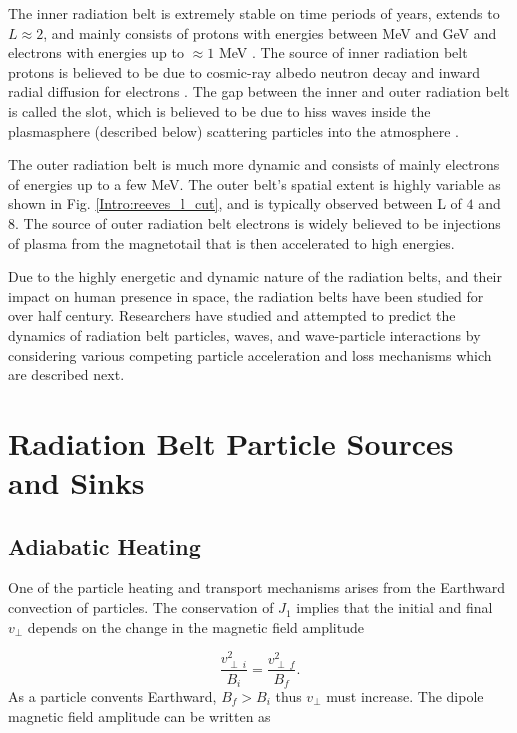The inner radiation belt is extremely stable on time periods of years, extends to $L \approx 2$, and mainly consists of protons with energies between MeV and GeV and electrons with energies up to $\approx 1$ MeV \citep{Claudepierre2019}. The source of inner radiation belt protons is believed to be due to cosmic-ray albedo neutron decay \citep[e.g.][]{Li2017_CRAND} and inward radial diffusion for electrons \citep[e.g.][]{O'Brien2016_inner}. The gap between the inner and outer radiation belt is called the slot, which is believed to be due to hiss waves inside the plasmasphere (described below) scattering particles into the atmosphere \citep[e.g.][]{Lyons1973, Breneman2015}.

The outer radiation belt is much more dynamic and consists of mainly electrons of energies up to a few MeV. The outer belt's spatial extent is highly variable as shown in Fig. \ref{Intro:reeves_l_cut}, and is typically observed between L of $4$ and $8$. The source of outer radiation belt electrons is widely believed to be injections of plasma from the magnetotail that is then accelerated to high energies.

Due to the highly energetic and dynamic nature of the radiation belts, and their impact on human presence in space, the radiation belts have been studied for over half century. Researchers have studied and attempted to predict the dynamics of radiation belt particles, waves, and wave-particle interactions by considering various competing particle acceleration and loss mechanisms which are described next.

\section{Radiation Belt Particle Sources and Sinks}\label{Intro:sources_sinks}

\subsection{Adiabatic Heating}\label{Intro:adiabatic_heating}
One of the particle heating and transport mechanisms arises from the Earthward convection of particles. The conservation of $J_1$ implies that the initial and final $v_\perp$ depends on the change in the magnetic field amplitude

\begin{equation}
\frac{v^2_{\perp \ i}}{B_i} = \frac{v^2_{\perp \ f}}{B_f}.
\end{equation} As a particle convents Earthward, $B_f > B_i$ thus $v_\perp$ must increase. The dipole magnetic field amplitude can be written as

